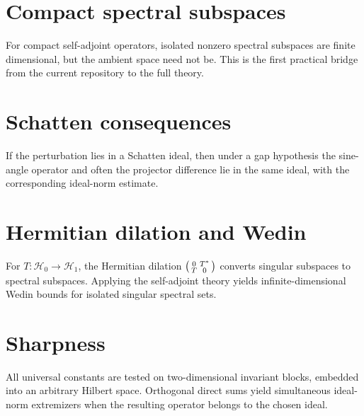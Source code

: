 \documentclass{article}
\newcommand{\Hh}{\mathcal H}
\begin{document}
\section{Compact spectral subspaces}
For compact self-adjoint operators, isolated nonzero spectral subspaces are
finite dimensional, but the ambient space need not be.  This is the first
practical bridge from the current repository to the full theory.

\section{Schatten consequences}
If the perturbation lies in a Schatten ideal, then under a gap hypothesis the
sine-angle operator and often the projector difference lie in the same ideal,
with the corresponding ideal-norm estimate.

\section{Hermitian dilation and Wedin}
For $T:\Hh_0\to\Hh_1$, the Hermitian dilation
$\begin{psmallmatrix}0&T^*\\T&0\end{psmallmatrix}$ converts singular subspaces
to spectral subspaces.  Applying the self-adjoint theory yields
infinite-dimensional Wedin bounds for isolated singular spectral sets.

\section{Sharpness}
All universal constants are tested on two-dimensional invariant blocks,
embedded into an arbitrary Hilbert space.  Orthogonal direct sums yield
simultaneous ideal-norm extremizers when the resulting operator belongs to the
chosen ideal.
\end{document}
